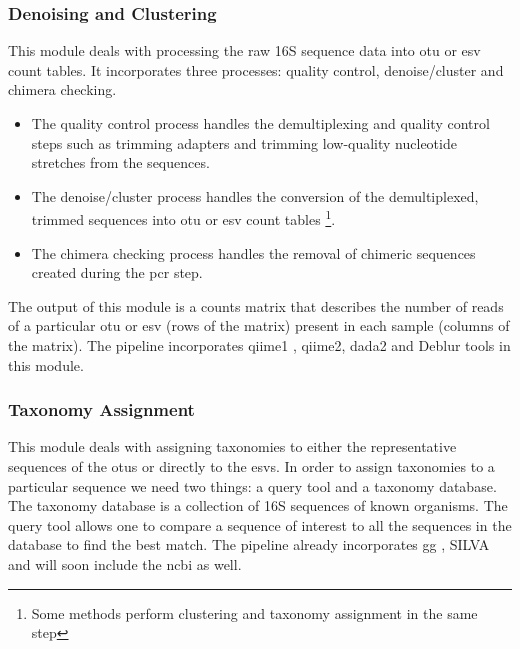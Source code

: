   \subsubsection*{Denoising and Clustering}
    \vspace{-5mm}
    This module deals with processing the raw 16S sequence data into \ac{otu} or \ac{esv} count tables.
    It incorporates three processes: quality control, denoise/cluster and chimera checking.
    \begin{itemize}
    \item The quality control process handles the demultiplexing and quality control steps such as trimming adapters and trimming low-quality nucleotide stretches from the sequences.
    \item The denoise/cluster process handles the conversion of the demultiplexed, trimmed sequences into \ac{otu} or \ac{esv} count tables \footnote{Some methods perform clustering and taxonomy assignment in the same step}.
    \item The chimera checking process handles the removal of chimeric sequences created during the \ac{pcr} step.
    \end{itemize}
    The output of this module is a counts matrix that describes the number of reads of a particular \ac{otu} or \ac{esv} (rows of the matrix) present in each sample (columns of the matrix). The pipeline incorporates \ac{qiime1} \cite{Caporaso2010}, \ac{qiime2}, \ac{dada2} \cite{Callahan2016} and Deblur \cite{Amir2017} tools in this module.

  \subsubsection*{Taxonomy Assignment}
    \vspace{-5mm}
    This module deals with assigning taxonomies to either the representative sequences of the \ac{otu}s or directly to the \ac{esv}s.
    In order to assign taxonomies to a particular sequence we need two things: a query tool and a taxonomy database.
    The taxonomy database is a collection of 16S sequences of known organisms.
    The query tool allows one to compare a sequence of interest to all the sequences in the database to find the best match.
    The pipeline already incorporates \ac{gg} \cite{DeSantis2006}, SILVA \cite{Quast2012} and will soon include the \ac{ncbi} \cite{Sayers2009} as well.

